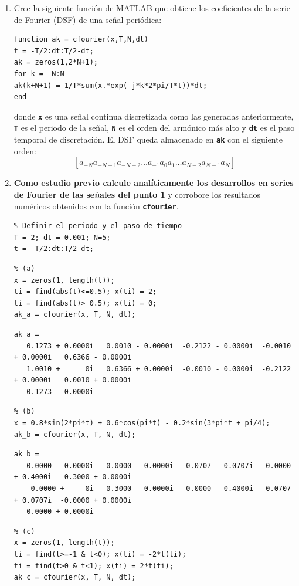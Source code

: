 \documentclass{article}
\newcommand{\code}[1]{\texttt{\textbf{#1}}}
\begin{document}
\begin{enumerate}[leftmargin=*]
\item Cree la siguiente función de MATLAB que obtiene los coeficientes de la serie de Fourier (DSF) de una señal periódica:

\begin{lstlisting}
function ak = cfourier(x,T,N,dt)
t = -T/2:dt:T/2-dt;
ak = zeros(1,2*N+1);
for k = -N:N
ak(k+N+1) = 1/T*sum(x.*exp(-j*k*2*pi/T*t))*dt;
end
\end{lstlisting}

donde \code{x} es una señal continua discretizada como las generadas anteriormente, \code{T} es el periodo de la señal, \code{N} es el orden del armónico más alto y \code{dt} es el paso temporal de discretación. El DSF queda almacenado en \code{ak} con el siguiente orden: \[ \left[a_{-N}a_{-N+1}a_{-N+2}\dots a_{-1}a_0a_1\dots a_{N-2}a_{N-1}a_{N}\right] \]
\item \textbf{Como estudio previo calcule analíticamente los desarrollos en series de Fourier de las señales del punto 1} y corrobore los resultados numéricos obtenidos con la función \code{cfourier}.

\begin{lstlisting}
% Definir el periodo y el paso de tiempo
T = 2; dt = 0.001; N=5;
t = -T/2:dt:T/2-dt;
\end{lstlisting}

\begin{lstlisting}
% (a)
x = zeros(1, length(t));
ti = find(abs(t)<=0.5); x(ti) = 2;
ti = find(abs(t)> 0.5); x(ti) = 0;
ak_a = cfourier(x, T, N, dt);
\end{lstlisting}
\begin{verbatim}
ak_a = 
   0.1273 + 0.0000i   0.0010 - 0.0000i  -0.2122 - 0.0000i  -0.0010 + 0.0000i   0.6366 - 0.0000i
   1.0010 +      0i   0.6366 + 0.0000i  -0.0010 - 0.0000i  -0.2122 + 0.0000i   0.0010 + 0.0000i
   0.1273 - 0.0000i
\end{verbatim}
\begin{lstlisting}
% (b)
x = 0.8*sin(2*pi*t) + 0.6*cos(pi*t) - 0.2*sin(3*pi*t + pi/4);
ak_b = cfourier(x, T, N, dt);
\end{lstlisting}

\begin{verbatim}
ak_b =
   0.0000 - 0.0000i  -0.0000 - 0.0000i  -0.0707 - 0.0707i  -0.0000 + 0.4000i   0.3000 + 0.0000i  
   -0.0000 +     0i   0.3000 - 0.0000i  -0.0000 - 0.4000i  -0.0707 + 0.0707i  -0.0000 + 0.0000i
   0.0000 + 0.0000i
\end{verbatim}

\begin{lstlisting}
% (c)
x = zeros(1, length(t));
ti = find(t>=-1 & t<0); x(ti) = -2*t(ti);
ti = find(t>0 & t<1); x(ti) = 2*t(ti);
ak_c = cfourier(x, T, N, dt);
\end{lstlisting}


\end{enumerate}
\end{document}
